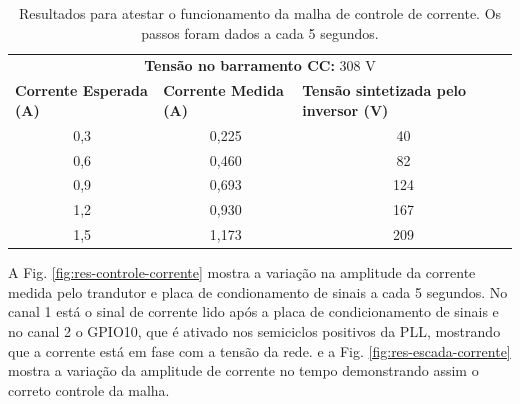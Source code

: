 \begin{table}[h]
	\centering
	\caption{Resultados para atestar o funcionamento da malha de controle de corrente. Os passos foram dados a cada 5 segundos.}
	\label{tab:res-controle-corrente}
	
	\begin{tabular}{m{5cm}m{5cm}m{5cm}}
		\toprule
		\multicolumn{3}{c}{\textbf{Tensão no barramento CC:} 308 V} \\
		\textbf{Corrente Esperada (A)} & \textbf{Corrente Medida (A)} & \textbf{Tensão sintetizada pelo inversor (V)}\\
		\midrule
		\multicolumn{1}{c}{0,3} & \multicolumn{1}{c}{0,225} & \multicolumn{1}{c}{40} \\
		\multicolumn{1}{c}{0,6} & \multicolumn{1}{c}{0,460} & \multicolumn{1}{c}{82} \\
		\multicolumn{1}{c}{0,9} & \multicolumn{1}{c}{0,693} & \multicolumn{1}{c}{124} \\
		\multicolumn{1}{c}{1,2} & \multicolumn{1}{c}{0,930} & \multicolumn{1}{c}{167} \\
		\multicolumn{1}{c}{1,5} & \multicolumn{1}{c}{1,173} & \multicolumn{1}{c}{209} \\
		\bottomrule
	\end{tabular}
\end{table}

A Fig. \ref{fig:res-controle-corrente} mostra a variação na amplitude da corrente medida pelo trandutor e placa de condionamento de sinais a cada 5 segundos. 
No canal 1 está o sinal de corrente lido após a placa de condicionamento de sinais e no canal 2 o GPIO10, que é ativado nos semiciclos positivos da PLL, mostrando que a corrente está em fase com a tensão da rede.
e a Fig. \ref{fig:res-escada-corrente} mostra a variação da amplitude de corrente no tempo demonstrando assim o correto controle da malha.

